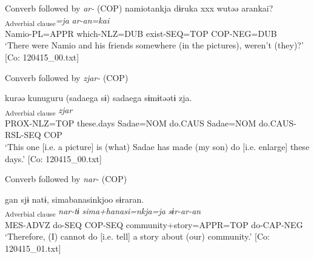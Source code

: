 \exi{} Converb followed by \textit{ar-} (COP)
\ex %
    \glll  namiotankja  dɨruka  xxx  wutəə    arankai?\\
      [\textit{namio-taa=nkja}  \textit{dɨ-ru=ka}    \textit{wur-tɨ}]\textsubscript{Adverbial clause}\textit{=ja}    \textit{ar-an=kai}\\
      Namio-PL=APPR  which-NLZ=DUB    exist-SEQ=TOP   COP-NEG=DUB\\
      \glt       ‘There were Namio and his friends somewhere (in the pictures), weren’t (they)?’ [Co: 120415\_00.txt]

\exi{} Converb followed by \textit{zjar-} (COP)

\ex \relax [= (8-123 a)]%
    \glll  kurəə  kunuguru  (sadaega  sɨ)   sadaega  sɨmɨtəətɨ  zja.\\
      [\textit{ku-rɨ=ja}  \textit{kunuguru}  \textit{sadae=ga}  \textit{sɨmɨr}   \textit{sadae=ga}  \textit{sɨmɨr-təər-tɨ}]\textsubscript{Adverbial clause}  \textit{zjar}\\
      PROX-NLZ=TOP  these.days  Sadae=NOM  do.CAUS   Sadae=NOM  do.CAUS-RSL-SEQ  COP\\      
      \glt ‘This one [i.e. a picture] is (what) Sadae has made (my son) do [i.e. enlarge] these days.’   [Co: 120415\_00.txt]

\exi{}  Converb followed by \textit{nar-} (COP)

\ex %
     \glll  gan  sjɨ  natɨ,  simabanasinkjoo  sɨraran.\\
      [\textit{ga-n}  \textit{sɨr-tɨ}]\textsubscript{Adverbial clause}  \textit{nar-tɨ}  \textit{sima+hanasi=nkja=ja}  \textit{sɨr-ar-an}\\
      MES-ADVZ  do-SEQ  COP-SEQ  community+story=APPR=TOP   do-CAP-NEG\\
      \glt       ‘Therefore, (I) cannot do [i.e. tell] a story about (our) community.’ [Co: 120415\_01.txt]
    \z
\z

